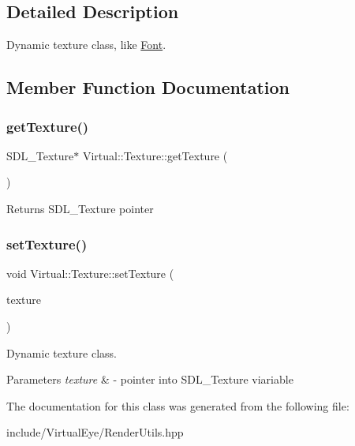 \subsection{Detailed Description}
Dynamic texture class, like \hyperlink{class_virtual_1_1_font}{Font}. 

\subsection{Member Function Documentation}
\hypertarget{class_virtual_1_1_texture_a5c870d3c9b6db63922aa5cf451cd3422}{}\label{class_virtual_1_1_texture_a5c870d3c9b6db63922aa5cf451cd3422} 
\subsubsection{\texorpdfstring{get\+Texture()}{getTexture()}}
{\footnotesize\ttfamily S\+D\+L\+\_\+\+Texture$\ast$ Virtual\+::\+Texture\+::get\+Texture (\begin{DoxyParamCaption}{ }\end{DoxyParamCaption})}

\begin{DoxyReturn}{Returns}
S\+D\+L\+\_\+\+Texture pointer 
\end{DoxyReturn}
\hypertarget{class_virtual_1_1_texture_a8e0ffa6f92bfb5afab975a59f2b3b92f}{}\label{class_virtual_1_1_texture_a8e0ffa6f92bfb5afab975a59f2b3b92f} 
\subsubsection{\texorpdfstring{set\+Texture()}{setTexture()}}
{\footnotesize\ttfamily void Virtual\+::\+Texture\+::set\+Texture (\begin{DoxyParamCaption}\item[{S\+D\+L\+\_\+\+Texture $\ast$}]{texture }\end{DoxyParamCaption})}



Dynamic texture class. 


\begin{DoxyParams}{Parameters}
{\em texture} & -\/ pointer into S\+D\+L\+\_\+\+Texture viariable \\
\hline
\end{DoxyParams}


The documentation for this class was generated from the following file\+:\begin{DoxyCompactItemize}
\item 
include/\+Virtual\+Eye/Render\+Utils.\+hpp\end{DoxyCompactItemize}
